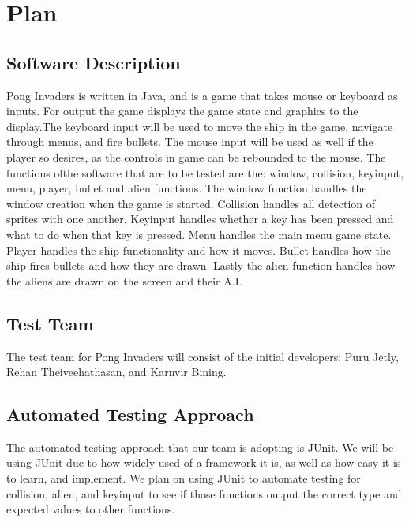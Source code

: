 \documentclass[12pt, titlepage]{article}
\begin{document}
\section{Plan}
	
\subsection{Software Description}
Pong Invaders is written in Java, and is a game that takes mouse or keyboard as
inputs. For output the game displays the game state and graphics to the
display.The keyboard input will be used to move the ship in the game, navigate
through
menus, and fire bullets. The mouse input will be used as well if the player so
desires, as the controls in game can be rebounded to the mouse. The functions
ofthe %
software that are to be tested are the: window, collision, keyinput,
menu,%
player, bullet and alien functions. The window function handles the window
creation when the game is started. Collision handles all detection of sprites
with one another. Keyinput handles whether a key has been pressed and what to
do when that key is pressed. Menu handles the main menu game state. Player
handles the ship functionality and how it moves. Bullet handles how the ship
fires
bullets and how they are drawn. Lastly the alien function handles how the
aliens are drawn on the screen and their A.I.

\subsection{Test Team}
The test team for Pong Invaders will consist of the initial developers: Puru
Jetly, Rehan Theiveehathasan, and Karnvir Bining.


\subsection{Automated Testing Approach}
The automated testing approach that our team is adopting is JUnit. We will be
using JUnit due to how widely used of a framework it is, as well as how easy it
is to learn,%
 and implement. We plan on using JUnit to automate testing for %
collision, alien, and keyinput to see if those functions output the correct
type and expected values to other functions.
\end{document}
